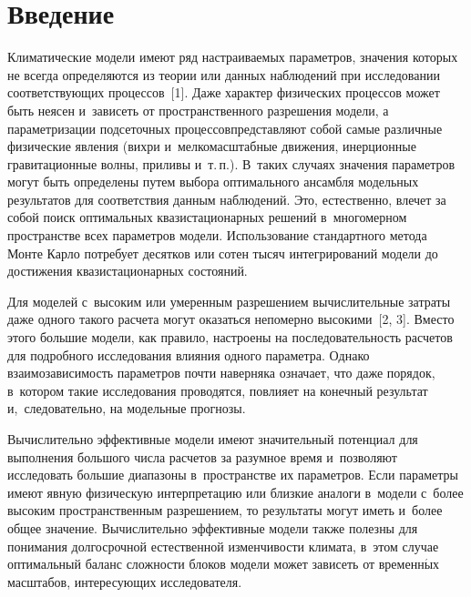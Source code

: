 \thispagestyle{headings}

\begin{multicols}{2}

\label{st\stat}
  
\section{Введение}

  Климатические модели имеют ряд на\-стра\-и\-ва\-емых параметров, значения 
которых не всегда определяются из теории или данных наблюдений при 
исследовании соответствующих процессов~[1]. Даже характер физических 
процессов может быть неясен и~зависеть от пространственного разрешения 
модели, а параметризации подсеточных процессов\linebreak представляют собой самые 
различные физические явления (вихри и~мелкомасштабные движения, 
инерционные гравитационные волны, приливы и~т.\,п.). В~таких случаях 
значения параметров могут быть определены путем выбора оптимального 
ансамбля модельных результатов для соответствия данным наблюдений. Это, 
естественно, влечет за собой поиск оптимальных квазистационарных решений 
в~многомерном пространстве всех па\-ра\-мет\-ров модели. Использование 
стандартного метода Мон\-те Кар\-ло потребует десятков или сотен тысяч 
интегрирований модели до достижения квазистационарных состояний. 

Для 
моделей с~высоким или умеренным разрешением вычислительные затраты 
даже одного такого расчета могут оказаться непомерно высокими~[2, 3]. 
Вместо этого большие модели, как правило, настроены на последовательность 
расчетов для подробного исследования влияния одного параметра. Однако 
взаимозависимость параметров почти наверняка означает, что даже порядок, 
в~котором такие исследования проводятся, повлияет на конечный результат 
и,~следовательно, на модельные прогнозы. 

Вычислительно эффективные 
модели имеют значительный потенциал для выполнения большого числа 
расчетов за разумное время и~позволяют исследовать большие диапазоны 
в~пространстве их параметров. Если параметры имеют явную физическую 
интерпретацию или близкие аналоги в~модели с~более высоким 
пространственным разрешением, то результаты могут иметь и~более общее 
значение. Вычислительно эффективные модели также полезны для понимания 
долгосрочной естественной изменчивости климата, в~этом случае оптимальный 
баланс сложности блоков модели может зависеть от временн$\acute{\mbox{ы}}$х масштабов, 
интересующих исследователя. 
  

\end{multicols}
